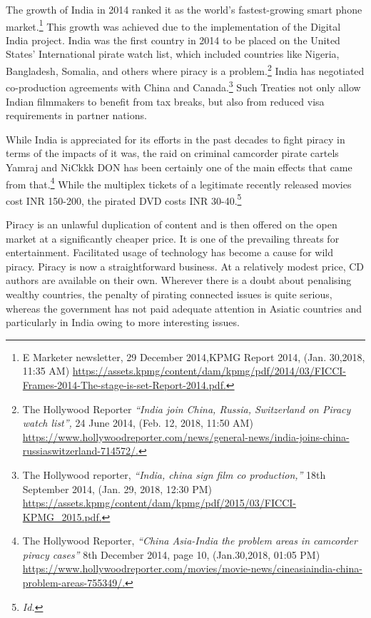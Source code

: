 \begin{multicols}{2}
\noi
The growth of India in 2014 ranked it as the world's fastest-growing smart phone market.\footnote{E Marketer newsletter, 29 December 2014,KPMG Report 2014, (Jan. 30,2018, 11:35 AM)   \url{https://assets.kpmg/content/dam/kpmg/pdf/2014/03/FICCI-Frames-2014-The-stage-is-set-Report-2014.pdf.}}
This growth was achieved due to the implementation of the Digital India project. India was
the first country in 2014 to be placed on the United States' International pirate watch list,
which included countries like Nigeria, Bangladesh, Somalia, and others where piracy is a
problem.\footnote{The Hollywood Reporter \textit{“India join China, Russia, Switzerland on Piracy watch list”,} 24 June 2014, (Feb.
12, 2018, 11:50 AM)\\ \url{https://www.hollywoodreporter.com/news/general-news/india-joins-china-russiaswitzerland-714572/.}} India has negotiated co-production agreements with China and Canada.\footnote{The Hollywood reporter, \textit{“India, china sign film co production,”} 18th September 2014, (Jan. 29, 2018, 12:30 PM)  \url{https://assets.kpmg/content/dam/kpmg/pdf/2015/03/FICCI-KPMG_2015.pdf.}} Such
Treaties not only allow Indian filmmakers to benefit from tax breaks, but also from reduced
visa requirements in partner nations.

\vspace{-.1cm}

\noi
While India is appreciated for its efforts in the past decades to fight piracy in terms of the
impacts of it was, the raid on criminal camcorder pirate cartels Yamraj and NiCkkk DON has
been certainly one of the main effects that came from that.\footnote{The Hollywood Reporter, \textit{“China Asia-India the problem areas in camcorder piracy cases”} 8th December 2014, page 10, (Jan.30,2018, 01:05 PM)  \url{https://www.hollywoodreporter.com/movies/movie-news/cineasiaindia-china-problem-areas-755349/.}} While the multiplex tickets of a legitimate recently released movies cost INR 150-200, the pirated DVD costs INR 30-40.\footnote{\textit{Id.}}

\vspace{-.1cm}


\vspace{-.1cm}

\noi
Piracy is an unlawful duplication of content and is then offered on the open market at a
significantly cheaper price. It is one of the prevailing threats for entertainment. Facilitated
usage of technology has become a cause for wild piracy. Piracy is now a straightforward
business. At a relatively modest price, CD authors are available on their own. Wherever there
is a doubt about penalising wealthy countries, the penalty of pirating connected issues is quite
serious, whereas the government has not paid adequate attention in Asiatic countries and
particularly in India owing to more interesting issues.


\end{multicols}
